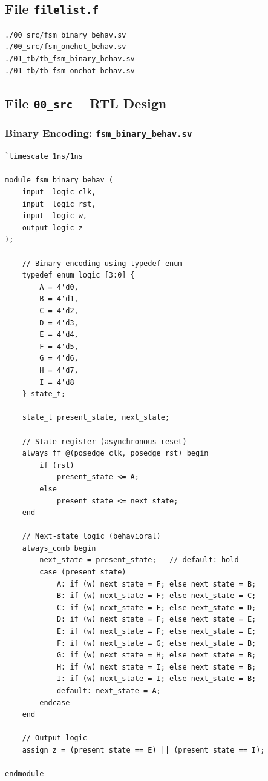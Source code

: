 \documentclass[12pt, a4paper]{article}
\begin{document}
\subsection{File \texttt{filelist.f}}
\label{subsec:exp4-filelist}

\begin{lstlisting}[style=plainfile, caption={Nội dung file \texttt{filelist.f} -- Experiment 4.}]
./00_src/fsm_binary_behav.sv
./00_src/fsm_onehot_behav.sv
./01_tb/tb_fsm_binary_behav.sv
./01_tb/tb_fsm_onehot_behav.sv
\end{lstlisting}

\subsection{File \texttt{00\_src} -- RTL Design}
\label{subsec:exp4-src}

\subsubsection{Binary Encoding: \texttt{fsm\_binary\_behav.sv}}

\begin{lstlisting}[caption={\texttt{00\_src/fsm\_binary\_behav.sv} -- Binary Encoding, Behavioral Style.},
                   label={lst:exp4-binary}]
`timescale 1ns/1ns

module fsm_binary_behav (
    input  logic clk,
    input  logic rst,
    input  logic w,
    output logic z
);

    // Binary encoding using typedef enum
    typedef enum logic [3:0] {
        A = 4'd0,
        B = 4'd1,
        C = 4'd2,
        D = 4'd3,
        E = 4'd4,
        F = 4'd5,
        G = 4'd6,
        H = 4'd7,
        I = 4'd8
    } state_t;

    state_t present_state, next_state;

    // State register (asynchronous reset)
    always_ff @(posedge clk, posedge rst) begin
        if (rst)
            present_state <= A;
        else
            present_state <= next_state;
    end

    // Next-state logic (behavioral)
    always_comb begin
        next_state = present_state;   // default: hold
        case (present_state)
            A: if (w) next_state = F; else next_state = B;
            B: if (w) next_state = F; else next_state = C;
            C: if (w) next_state = F; else next_state = D;
            D: if (w) next_state = F; else next_state = E;
            E: if (w) next_state = F; else next_state = E;
            F: if (w) next_state = G; else next_state = B;
            G: if (w) next_state = H; else next_state = B;
            H: if (w) next_state = I; else next_state = B;
            I: if (w) next_state = I; else next_state = B;
            default: next_state = A;
        endcase
    end

    // Output logic
    assign z = (present_state == E) || (present_state == I);

endmodule
\end{lstlisting}
\end{document}
